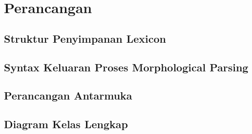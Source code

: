 \chapter{Perancangan}
\label{chap:perancangan}

\section{Struktur Penyimpanan Lexicon}
\label{sec:strukturPenyimpananLexicon}

\section{Syntax Keluaran Proses Morphological Parsing}
\label{sec:syntaxKeluaran}

\section{Perancangan Antarmuka}
\label{sec:perancanganAntarmuka}

\section{Diagram Kelas Lengkap}
\label{sec:DiagramKelasLengkap}